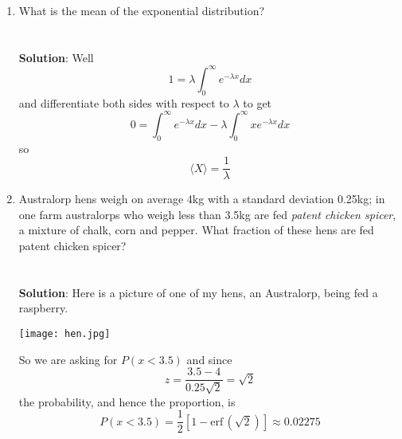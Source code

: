 \documentclass[11pt,a4paper]{scrartcl}
\begin{document}
\begin{enumerate}
\item What is the mean of the exponential distribution?
  \\ \\ \\ \textbf{Solution}: Well
  \begin{equation}
    1=\lambda\int_0^\infty e^{-\lambda x}dx
  \end{equation}
  and differentiate both sides with respect to $\lambda$ to get
  \begin{equation}
    0=\int_0^\infty e^{-\lambda x}dx-\lambda \int_0^\infty xe^{-\lambda x}dx
  \end{equation}
  so
  \begin{equation}
    \langle X\rangle=\frac{1}{\lambda}
  \end{equation}
    
\item Australorp hens weigh on average 4kg with a standard deviation
  0.25kg; in one farm australorps who weigh less than 3.5kg are fed
  \textsl{patent chicken spicer}, a mixture of chalk, corn and
  pepper. What fraction of these hens are fed patent chicken spicer?
  \\ \\ \\ \textbf{Solution}: Here is a picture of one of my hens, an Australorp, being fed a raspberry.
  \begin{center}
    \texttt{[image: hen.jpg]}
  \end{center}
  So we are asking for $P(x<3.5)$ and since
  $$z=\frac{3.5-4}{0.25\sqrt{2}}=\sqrt{2}$$
    the probability, and hence the proportion, is
    $$P(x<3.5)=\frac{1}{2}[1-\mbox{erf}\,(\sqrt{2})]\approx 0.02275$$

  
\end{enumerate}
\end{document}
